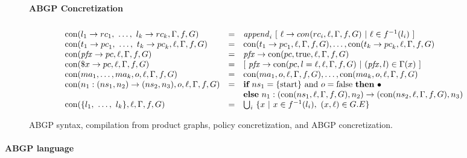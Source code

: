 \documentclass[twocolumn, openany]{sig-alternate-10pt}
\newcommand{\para}[1]{\paragraph*{\textbf{#1}}}
\newcommand{\hdr}[2]{\flushleft \chdr{\hspace{5mm}#1}{#2}}
\newcommand{\chdr}[2]{\textbf{#1} {#2} \\ \centering}%
\begin{document}
\begin{figure*}[t!]
  \begin{minipage}[t]{\linewidth}
  \hdr{ABGP Concretization}{}
  \vspace*{-2\baselineskip}
  \[ \begin{array}{lcl}
     \\
     \Con(l_1 \rightarrow {rc}_1, ~\dots,~ l_k \rightarrow {rc}_k,\Gamma,f,G)
        & = &
        \mathit{append}_i~ [~ \ell \rightarrow con(rc_i,\ell,\Gamma,f,G)  ~\vert~ \ell \in f^{-1}(l_i) ~]
        \\
     \Con(t_1 \rightarrow {pc}_1, ~\dots,~ t_k \rightarrow {pc}_k,\ell,\Gamma,f,G)
        & = &
        \Con(t_1 \rightarrow {pc}_1,\ell,\Gamma,f,G), \dots, \Con(t_k \rightarrow {pc}_k,\ell,\Gamma,f,G)
        \\
     \Con(\Pfx \rightarrow {pc},\ell,\Gamma,f,G)
        & = &
        \Pfx \rightarrow \Con(pc,\text{true},\ell,\Gamma,f,G)
        \\
     \Con(\$x \rightarrow {pc},\ell,\Gamma,f,G)
        & = &
        [~ \Pfx \rightarrow \Con(pc, l=\ell, \ell,\Gamma,f,G) ~\vert~ (\Pfx, l) \in \Gamma(x) ~]
        \\
     \Con(ma_1, \dots, ma_k,o,\ell,\Gamma,f,G)
        & = &
        \Con(ma_1,o,\ell,\Gamma,f,G), \dots, \Con(ma_k,o,\ell,\Gamma,f,G)
        \\%
     \Con(n_1 : ({ns}_1, n_2) \rightarrow ({ns}_2, n_3),o,\ell,\Gamma,f,G)
        & = & \textbf{if}~ ns_1 = \{\text{start}\} ~\text{and}~ o = \text{false} ~\textbf{then}~ \bullet \\
        &   & \textbf{else}~ n_1 : ( \Con({ns}_1,\ell,\Gamma,f,G), n_2) \rightarrow (\Con({ns}_2,\ell,\Gamma,f,G),n_3)%

        \\
     \Con(\{ l_1, ~\dots,~ l_k \}, \ell, \Gamma,f,G)
        & = &
        \bigcup_i ~ \{ x ~\vert~ x \in f^{-1}(l_i),~ (x,\ell) \in G.E \}
        \\
  \end{array} \]%
  \end{minipage}%

  \vspace{1em}
  \hrulefill%
  \vspace{1em}%

  \caption{ABGP syntax, compilation from product graphs, policy concretization, and ABGP concretization.}
  \label{fig:concretization}
\end{figure*}%


\para{ABGP language}
\end{document}
